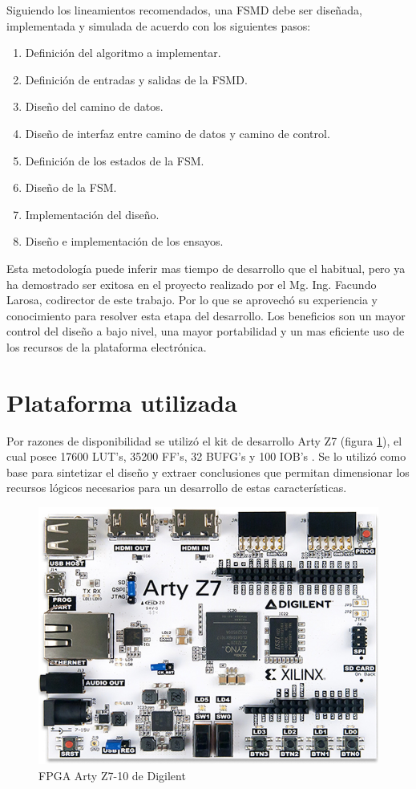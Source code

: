 	
	Siguiendo los lineamientos recomendados, una FSMD debe ser diseñada, implementada y simulada de acuerdo con los siguientes pasos:
	
	\begin{enumerate}
		\item Definición del algoritmo a implementar.
		\item Definición de entradas y salidas de la FSMD.
		\item Diseño del camino de datos.
		\item Diseño de interfaz entre camino de datos y camino de control.
		\item Definición de los estados de la FSM.
		\item Diseño de la FSM.
		\item Implementación del diseño.
		\item Diseño e implementación de los ensayos.
	\end{enumerate}
	
	Esta metodología puede inferir mas tiempo de desarrollo que el habitual, pero ya ha demostrado ser exitosa en el proyecto realizado por el Mg. Ing. Facundo Larosa, codirector de este trabajo. Por lo que se aprovechó su experiencia y conocimiento para resolver esta etapa del desarrollo. Los beneficios son un mayor control del diseño a bajo nivel, una mayor portabilidad y un mas eficiente uso de los recursos de la plataforma electrónica.


\section{Plataforma utilizada}

	Por razones de disponibilidad se utilizó el kit de desarrollo Arty Z7  (figura \ref{fig:FPGA}), el cual posee 17600 LUT’s, 35200 FF’s, 32 BUFG’s y 100 IOB’s \cite{cite28}. Se lo utilizó como base para sintetizar el diseño y extraer conclusiones que permitan dimensionar los recursos lógicos necesarios para un desarrollo de estas características.
	
	\begin{figure}[h]
	\centering
		\includegraphics[scale=.55]{./Figures/FPGA}
		\caption{FPGA Arty Z7-10 de Digilent}
	\label{fig:FPGA}	
	\end{figure}			
			
